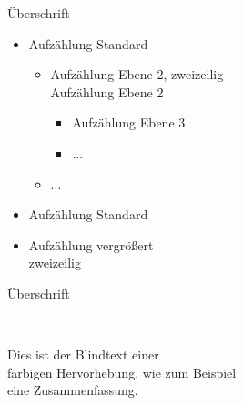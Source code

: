 \documentclass[xcolor=table,9pt,aspectratio=169]{beamer}
\begin{document}
\begin{frame}{\vspace*{10mm}Überschrift}
\vspace*{-10mm}
\begin{itemize}
\item Aufzählung Standard
	\begin{itemize}
	\item
	Aufzählung Ebene 2, zweizeilig\\
	Aufzählung Ebene 2
		\begin{itemize}
		\item Aufzählung Ebene 3
		\item ...
		\end{itemize}
	\item ...
	\end{itemize}
     	\item Aufzählung Standard
     	\item \fontsize{11}{16}\selectfont Aufzählung vergrößert\\
     	 zweizeilig
\end{itemize}
   
\end{frame}
\begin{frame}{\vspace*{10mm}Überschrift}

\lipsum[1][1-6]\\

\begin{center}
  
{\color{blue2} \fontsize{16}{16} \selectfont%
Dies ist der Blindtext einer\\[0.2ex]
farbigen Hervorhebung, wie zum Beispiel\\[0.2ex]
eine Zusammenfassung.}
\end{center}
\end{frame}
\end{document}
